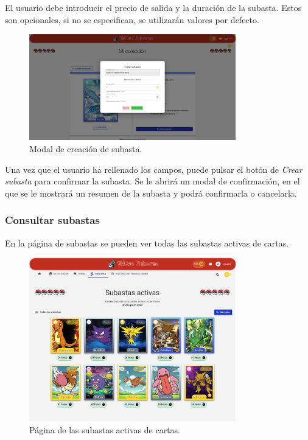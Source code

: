 \begin{enumerate}
El usuario debe introducir el precio de salida y la duración de la subasta. Estos son opcionales, si no se especifican, se utilizarán
valores por defecto.

\begin{figure}[H]
    \centering
    \includegraphics[width=0.8\textwidth]{figures/6-Analisis/6-Interfaz/interfaz/crear-subasta1.png}
    \caption{Modal de creación de subasta.}
    \hypertarget{fig:interfaz-subasta}{}
    \label{fig:m-interfaz-subasta}
\end{figure}


Una vez que el usuario ha rellenado los campos, puede pulsar el botón de \textit{Crear subasta} para confirmar la subasta.
Se le abrirá un modal de confirmación, en el que se le mostrará un resumen de la subasta y podrá confirmarla o cancelarla.

\subsubsection{Consultar subastas}
En la página de subastas se pueden ver todas las subastas activas de cartas.
\begin{figure}[H]
    \centering
    \includegraphics[width=0.8\textwidth]{figures/6-Analisis/6-Interfaz/interfaz/subastas.png}
    \caption{Página de las subastas activas de cartas.}
    \label{fig:m-interfaz-subastas}
\end{figure}


\end{enumerate}
